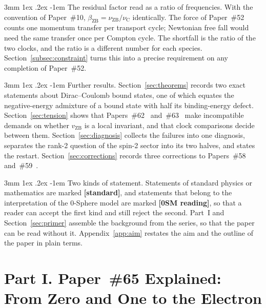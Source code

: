 \documentclass[%
 reprint, amsmath,amssymb, aps, prb, ]{revtex4-2}
\makeatletter
\numberwithin{equation}{section}
\renewcommand\paragraph{%
  \@startsection{paragraph}{4}{\z@}%
    {3mm \@plus 1ex \@minus .2ex}%
    {-1em}%
    {\normalfont\normalsize\itshape}}
\newcommand{\vZB}{v_{\text{ZB}}}
\newcommand{\betaZB}{\beta_{\text{ZB}}}
\newcommand{\nuZB}{\nu_{\text{ZB}}}
\newcommand{\nuC}{\nu_{\text{C}}}
\makeatother
\begin{document}
\paragraph{The residual factor read as a ratio of frequencies.} With the convention of Paper~\#10, $\betaZB = \nuZB/\nuC$ identically. The force of Paper~\#52 counts one momentum transfer per transport cycle; Newtonian free fall would need the same transfer once per Compton cycle. The shortfall is the ratio of the two clocks, and the ratio is a different number for each species. Section~\ref{subsec:constraint} turns this into a precise requirement on any completion of Paper~\#52.

\paragraph{Further results.} Section~\ref{sec:theorems} records two exact statements about Dirac--Coulomb bound states, one of which equates the negative-energy admixture of a bound state with half its binding-energy defect. Section~\ref{sec:tension} shows that Papers~\#62~\cite{hanamura62} and~\#63~\cite{hanamura63} make incompatible demands on whether $\vZB$ is a local invariant, and that clock comparisons decide between them. Section~\ref{sec:diagnosis} collects the failures into one diagnosis, separates the rank-2 question of the spin-2 sector into its two halves, and states the restart. Section~\ref{sec:corrections} records three corrections to Papers~\#58 and~\#59~\cite{hanamura59}.

\paragraph{Two kinds of statement.} Statements of standard physics or mathematics are marked \textbf{[standard]}, and statements that belong to the interpretation of the 0-Sphere model are marked \textbf{[0SM reading]}, so that a reader can accept the first kind and still reject the second. Part~I and Section~\ref{sec:primer} assemble the background from the series, so that the paper can be read without it. Appendix~\ref{app:aim} restates the aim and the outline of the paper in plain terms.

\section{Part I. Paper~\#65 Explained: From Zero and One to the Electron}
\label{sec:guide}
\end{document}
